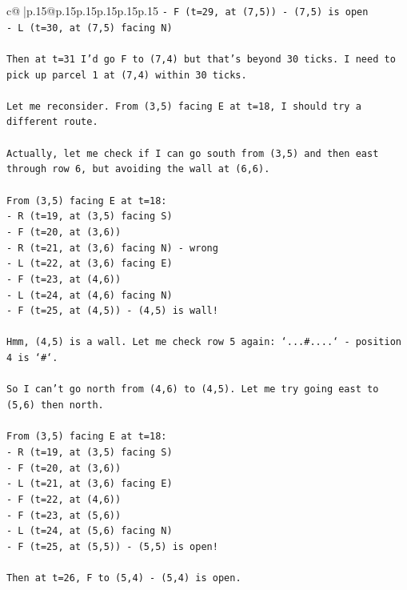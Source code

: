 \documentclass{article}
\begin{document}
{\begin{supertabular}{c@{$\;$}|p{.15\linewidth}@{}p{.15\linewidth}p{.15\linewidth}p{.15\linewidth}p{.15\linewidth}p{.15\linewidth}}
{{{\texttt{{-} F (t=29, at (7,5)) {-} (7,5) is open} \\
\texttt{{-} L (t=30, at (7,5) facing N)} \\
\\ 
\texttt{Then at t=31 I'd go F to (7,4) but that's beyond 30 ticks. I need to pick up parcel 1 at (7,4) within 30 ticks.} \\
\\ 
\texttt{Let me reconsider. From (3,5) facing E at t=18, I should try a different route.} \\
\\ 
\texttt{Actually, let me check if I can go south from (3,5) and then east through row 6, but avoiding the wall at (6,6).} \\
\\ 
\texttt{From (3,5) facing E at t=18:} \\
\texttt{{-} R (t=19, at (3,5) facing S)} \\
\texttt{{-} F (t=20, at (3,6))} \\
\texttt{{-} R (t=21, at (3,6) facing N) {-} wrong} \\
\texttt{{-} L (t=22, at (3,6) facing E)} \\
\texttt{{-} F (t=23, at (4,6))} \\
\texttt{{-} L (t=24, at (4,6) facing N)} \\
\texttt{{-} F (t=25, at (4,5)) {-} (4,5) is wall!} \\
\\ 
\texttt{Hmm, (4,5) is a wall. Let me check row 5 again: `...\#....` {-} position 4 is `\#`.} \\
\\ 
\texttt{So I can't go north from (4,6) to (4,5). Let me try going east to (5,6) then north.} \\
\\ 
\texttt{From (3,5) facing E at t=18:} \\
\texttt{{-} R (t=19, at (3,5) facing S)} \\
\texttt{{-} F (t=20, at (3,6))} \\
\texttt{{-} L (t=21, at (3,6) facing E)} \\
\texttt{{-} F (t=22, at (4,6))} \\
\texttt{{-} F (t=23, at (5,6))} \\
\texttt{{-} L (t=24, at (5,6) facing N)} \\
\texttt{{-} F (t=25, at (5,5)) {-} (5,5) is open!} \\
\\ 
\texttt{Then at t=26, F to (5,4) {-} (5,4) is open.} \\
}}}
\end{supertabular}}
\end{document}
